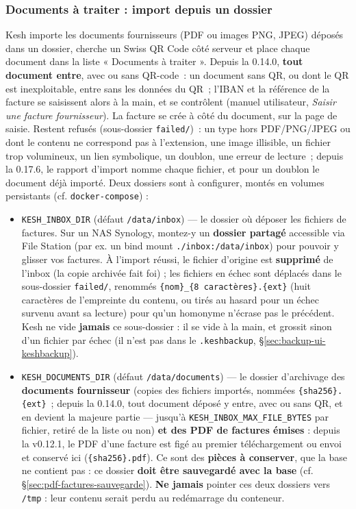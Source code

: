 \documentclass[a4paper,11pt,oneside]{article}
\begin{document}
\subsubsection{Documents à traiter : import depuis un dossier}
\label{sec:inbox-import}

Kesh importe les documents fournisseurs (PDF ou images PNG, JPEG) déposés dans un
dossier, cherche un Swiss QR Code côté serveur et place chaque document dans la liste
« Documents à traiter ». Depuis la 0.14.0, \textbf{tout document entre}, avec ou sans
QR-code~: un document sans QR, ou dont le QR est inexploitable, entre sans les données
du QR~; l'IBAN et la référence de la facture se saisissent alors à la main, et se
contrôlent (manuel utilisateur, \emph{Saisir une facture fournisseur}). La facture se crée
à côté du document, sur la page de saisie. Restent refusés (sous-dossier \texttt{failed/})~: un type hors
PDF/PNG/JPEG ou dont le contenu ne correspond pas à l'extension, une image illisible, un
fichier trop volumineux, un lien symbolique, un doublon, une erreur de lecture~; depuis la
0.17.6, le rapport d'import nomme chaque fichier, et pour un doublon le document déjà
importé. Deux
dossiers sont à configurer, montés en volumes persistants (cf. \texttt{docker-compose}) :

\begin{itemize}
    \item \texttt{KESH\_INBOX\_DIR} (défaut \texttt{/data/inbox}) — le dossier où
    déposer les fichiers de factures. Sur un NAS Synology, montez-y un
    \textbf{dossier partagé} accessible via File Station (par ex. un bind mount
    \texttt{./inbox:/data/inbox}) pour pouvoir y glisser vos factures. À l'import
    réussi, le fichier d'origine est \textbf{supprimé} de l'inbox (la copie
    archivée fait foi) ; les fichiers en échec sont déplacés dans le
    sous-dossier \texttt{failed/}, renommés \texttt{\{nom\}\_\{8 caractères\}.\{ext\}}
    (huit caractères de l'empreinte du contenu, ou tirés au hasard pour un échec
    survenu avant sa lecture) pour qu'un homonyme n'écrase pas le précédent. Kesh ne
    vide \textbf{jamais} ce sous-dossier : il se vide à la main, et grossit sinon d'un
    fichier par échec (il n'est pas dans le \texttt{.keshbackup},
    \S\ref{sec:backup-ui-keshbackup}).
    \item \texttt{KESH\_DOCUMENTS\_DIR} (défaut \texttt{/data/documents}) — le
    dossier d'archivage des \textbf{documents fournisseur} (copies des fichiers
    importés, nommées \texttt{\{sha256\}.\{ext\}}~; depuis la 0.14.0, tout document
    déposé y entre, avec ou sans QR, et en devient la majeure partie --- jusqu'à
    \texttt{KESH\_INBOX\_MAX\_FILE\_BYTES} par fichier, retiré de la liste ou non)
    \textbf{et des PDF de factures émises} : depuis la
    v0.12.1, le PDF d'une facture est figé au premier téléchargement ou envoi et
    conservé ici (\texttt{\{sha256\}.pdf}). Ce sont des \textbf{pièces à conserver},
    que la base ne contient pas : ce dossier \textbf{doit être sauvegardé avec la
    base} (cf. \S\ref{sec:pdf-factures-sauvegarde}). \textbf{Ne jamais} pointer ces deux dossiers
    vers \texttt{/tmp} : leur contenu serait perdu au redémarrage du conteneur.
\end{itemize}
\end{document}
